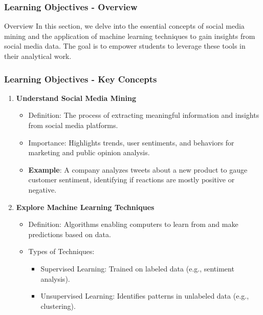\documentclass{beamer}
\begin{document}
\begin{frame}
    \frametitle{Learning Objectives - Overview}
    \begin{block}{Overview}
        In this section, we delve into the essential concepts of social media mining and the application of machine learning techniques to gain insights from social media data. The goal is to empower students to leverage these tools in their analytical work.
    \end{block}
\end{frame}

\begin{frame}
    \frametitle{Learning Objectives - Key Concepts}
    \begin{enumerate}
        \item \textbf{Understand Social Media Mining}
        \begin{itemize}
            \item Definition: The process of extracting meaningful information and insights from social media platforms.
            \item Importance: Highlights trends, user sentiments, and behaviors for marketing and public opinion analysis.
            \item \textbf{Example}: A company analyzes tweets about a new product to gauge customer sentiment, identifying if reactions are mostly positive or negative.
        \end{itemize}

        \item \textbf{Explore Machine Learning Techniques}
        \begin{itemize}
            \item Definition: Algorithms enabling computers to learn from and make predictions based on data.
            \item Types of Techniques:
            \begin{itemize}
                \item Supervised Learning: Trained on labeled data (e.g., sentiment analysis).
                \item Unsupervised Learning: Identifies patterns in unlabeled data (e.g., clustering).
            \end{itemize}
        \end{itemize}
    \end{enumerate}
\end{frame}
\end{document}

